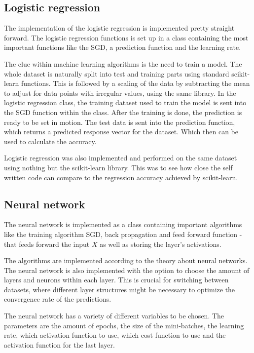 \documentclass[../main.tex]{subfiles}
\begin{document}
\subsection{Logistic regression}\label{sec:3logreg}
The implementation of the logistic regression is implemented pretty straight forward. The logistic regression functions is set up in a class containing the most important functions like the SGD, a prediction function and the learning rate.

The clue within machine learning algorithms is the need to train a model. The whole dataset is naturally split into test and training parts using standard scikit-learn functions. This is followed by a scaling of the data by subtracting the mean to adjust for data points with irregular values, using the same library. In the logistic regression class, the training dataset used to train the model is sent into the SGD function within the class. After the training is done, the prediction is ready to be set in motion. The test data is sent into the prediction function, which returns a predicted response vector for the dataset. Which then can be used to calculate the accuracy.

Logistic regression was also implemented and performed on the same dataset using nothing but the scikit-learn library. This was to see how close the self written code can compare to the regression accuracy achieved by scikit-learn.

\subsection{Neural network}
The neural network is implemented as a class containing important algorithms like the training algorithm SGD, back propagation and feed forward function - that feeds forward the input $X$ as well as storing the layer's activations.

The algorithms are implemented according to the theory about neural networks. The neural network is also implemented with the option to choose the amount of layers and neurons within each layer. This is crucial for switching between datasets, where different layer structures might be necessary to optimize the convergence rate of the predictions.

The neural network has a variety of different variables to be chosen. The parameters are the amount of epochs, the size of the mini-batches, the learning rate, which activation function to use, which cost function to use and the activation function for the last layer.
\end{document}
